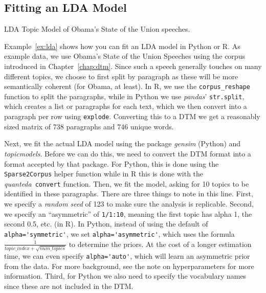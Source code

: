 \subsection{Fitting an LDA Model}


\begin{ccsexample}
\caption{LDA Topic Model of Obama's State of the Union speeches.}\label{ex:lda}
\end{ccsexample}

Example~\ref{ex:lda} shows how you can fit an LDA model in Python or R.
As example data, we use Obama's State of the Union Speeches using the corpus introduced in Chapter~\ref{chap:dtm}.
Since such a speech generally touches on many different topics, we choose to first split by paragraph
as these will be more semantically coherent (for Obama, at least).
In R, we use the \texttt{corpus\_reshape} function to split the paragraphs,
while in Python we use \emph{pandas}' \texttt{str.split}, which creates a list or paragraphs for each text,
which we then convert into a paragraph per row using \texttt{explode}.
Converting this to a DTM we get a reasonably sized matrix of 738 paragraphs and 746 unique words.

Next, we fit the actual LDA model using the package \emph{gensim} (Python) and \emph{topicmodels}.
Before we can do this, we need to convert the DTM format into a format accepted by that package.
For Python, this is done using the \texttt{Sparse2Corpus} helper function while in R this is done with the \emph{quanteda}\ \texttt{convert} function.
Then, we fit the model, asking for 10 topics to be identified in these paragraphs.
There are three things to note in this line.
First, we specify a \emph{random seed} of 123 to make sure the analysis is replicable.
Second, we specify an ``asymmetric'' of \verb|1/1:10|, meaning the first topic has alpha 1, the second 0.5, etc. (in R).
In Python, instead  of using the default of \verb|alpha='symmetric'|, we set  \verb|alpha='asymmetric'|, which uses the formula
$\frac{1}{topic\_index + \sqrt{num\_topics}}$ to determine the priors. At the cost of a longer estimation time, we can even
specify \verb|alpha='auto'|, which will learn an asymmetric prior from the data. For more background, see the note on hyperparameters for more information.
Third, for Python we also need to specify the vocabulary names since these are not included in the DTM.

